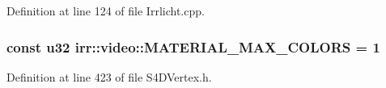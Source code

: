 Definition at line 124 of file Irrlicht.\-cpp.

\hypertarget{namespaceirr_1_1video_a66cca5372745a72c68cd5d6393f7b1ec}{
\subsubsection[{M\-A\-T\-E\-R\-I\-A\-L\-\_\-\-M\-A\-X\-\_\-\-C\-O\-L\-O\-R\-S}]{\setlength{\rightskip}{0pt plus 5cm}const u32 irr\-::video\-::\-M\-A\-T\-E\-R\-I\-A\-L\-\_\-\-M\-A\-X\-\_\-\-C\-O\-L\-O\-R\-S = 1}}\label{namespaceirr_1_1video_a66cca5372745a72c68cd5d6393f7b1ec}


Definition at line 423 of file S4\-D\-Vertex.\-h.

